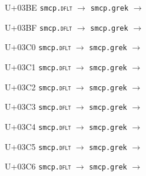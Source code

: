 \documentclass{article}
\begin{document}
\begin{substitutions}
\goodbreak

U+03BE  \linebreak
    \texttt{smcp.\textsc{dflt}} $\to$  \linebreak
    \texttt{smcp.grek} $\to$  

\goodbreak

U+03BF  \linebreak
    \texttt{smcp.\textsc{dflt}} $\to$  \linebreak
    \texttt{smcp.grek} $\to$  

\goodbreak

U+03C0  \linebreak
    \texttt{smcp.\textsc{dflt}} $\to$  \linebreak
    \texttt{smcp.grek} $\to$  

\goodbreak

U+03C1  \linebreak
    \texttt{smcp.\textsc{dflt}} $\to$  \linebreak
    \texttt{smcp.grek} $\to$  

\goodbreak

U+03C2  \linebreak
    \texttt{smcp.\textsc{dflt}} $\to$  \linebreak
    \texttt{smcp.grek} $\to$  

\goodbreak

U+03C3  \linebreak
    \texttt{smcp.\textsc{dflt}} $\to$  \linebreak
    \texttt{smcp.grek} $\to$  

\goodbreak

U+03C4  \linebreak
    \texttt{smcp.\textsc{dflt}} $\to$  \linebreak
    \texttt{smcp.grek} $\to$  

\goodbreak

U+03C5  \linebreak
    \texttt{smcp.\textsc{dflt}} $\to$  \linebreak
    \texttt{smcp.grek} $\to$  

\goodbreak

U+03C6  \linebreak
    \texttt{smcp.\textsc{dflt}} $\to$  \linebreak
    \texttt{smcp.grek} $\to$  


\end{substitutions}
\end{document}
